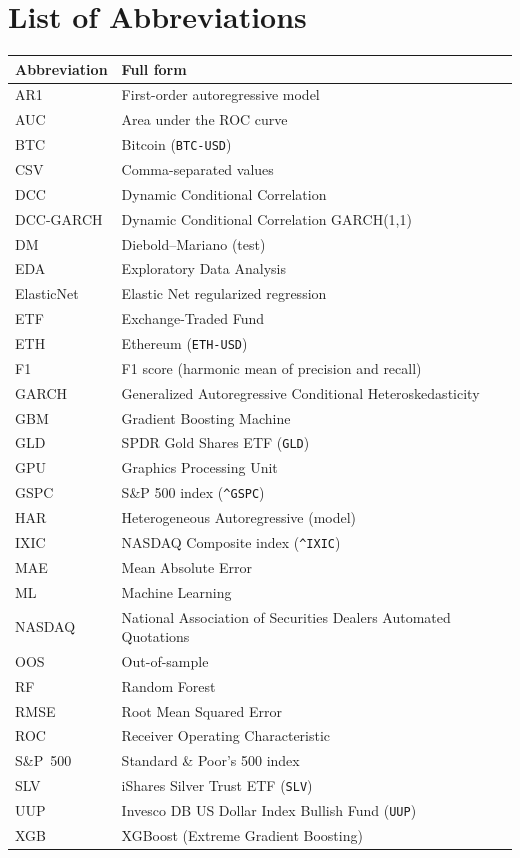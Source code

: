 \section*{List of Abbreviations}

\begin{tabular}{@{}p{3cm}p{11cm}@{}}
    \toprule
    \textbf{Abbreviation} & \textbf{Full form} \\
    \midrule
    AR1        & First-order autoregressive model \\
    AUC        & Area under the ROC curve \\
    BTC        & Bitcoin (\texttt{BTC-USD}) \\
    CSV        & Comma-separated values \\
    DCC        & Dynamic Conditional Correlation \\
    DCC-GARCH  & Dynamic Conditional Correlation GARCH(1,1) \\
    DM         & Diebold--Mariano (test) \\
    EDA        & Exploratory Data Analysis \\
    ElasticNet & Elastic Net regularized regression \\
    ETF        & Exchange-Traded Fund \\
    ETH        & Ethereum (\texttt{ETH-USD}) \\
    F1         & F1 score (harmonic mean of precision and recall) \\
    GARCH      & Generalized Autoregressive Conditional Heteroskedasticity \\
    GBM        & Gradient Boosting Machine \\
    GLD        & SPDR Gold Shares ETF (\texttt{GLD}) \\
    GPU        & Graphics Processing Unit \\
    GSPC       & S\&P 500 index (\texttt{\^{}GSPC}) \\
    HAR        & Heterogeneous Autoregressive (model) \\
    IXIC       & NASDAQ Composite index (\texttt{\^{}IXIC}) \\
    MAE        & Mean Absolute Error \\
    ML         & Machine Learning \\
    NASDAQ     & National Association of Securities Dealers Automated Quotations \\
    OOS        & Out-of-sample \\
    RF         & Random Forest \\
    RMSE       & Root Mean Squared Error \\
    ROC        & Receiver Operating Characteristic \\
    S\&P~500   & Standard \& Poor's 500 index \\
    SLV        & iShares Silver Trust ETF (\texttt{SLV}) \\
    UUP        & Invesco DB US Dollar Index Bullish Fund (\texttt{UUP}) \\
    XGB        & XGBoost (Extreme Gradient Boosting) \\
    \bottomrule
\end{tabular}

\newpage
